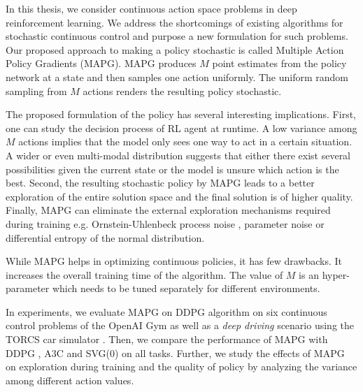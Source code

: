 In this thesis, we consider continuous action space problems in deep reinforcement learning. We address the shortcomings of existing algorithms for stochastic continuous control and purpose a new formulation for such problems. Our proposed approach to making a policy stochastic is called Multiple Action Policy Gradients (MAPG). MAPG produces $M$ point estimates from the policy network at a state and then samples one action uniformly. The uniform random sampling from $M$ actions renders the resulting policy stochastic. 

The proposed formulation of the policy has several interesting implications. First, one can study the decision process of RL agent at runtime. A low variance among $M$ actions implies that the model only sees one way to act in a certain situation. A wider or even multi-modal distribution suggests that either there exist several possibilities given the current state or the model is unsure which action is the best. Second, the resulting stochastic policy by MAPG leads to a better exploration of the entire solution space and the final solution is of higher quality. Finally, MAPG can eliminate the external exploration mechanisms required during training e.g. Ornstein-Uhlenbeck process noise \cite{ounoise}, parameter noise \cite{paramnoise} or differential entropy of the normal distribution.

While MAPG helps in optimizing continuous policies, it has few drawbacks. It increases the overall training time of the algorithm. The value of $M$ is an hyper-parameter which needs to be tuned separately for different environments. 

In experiments, we evaluate MAPG on DDPG \cite{ddpg} algorithm on six continuous control problems of the OpenAI Gym \cite{greg2016} as well as a \textit{deep driving} scenario using the TORCS car simulator \cite{TORCS}. Then, we compare the performance of MAPG with DDPG \cite{ddpg}, A3C \cite{a3c} and SVG(0) \cite{svg} on all tasks. Further, we study the effects of MAPG on exploration during training and the quality of policy by analyzing the variance among different action values.

